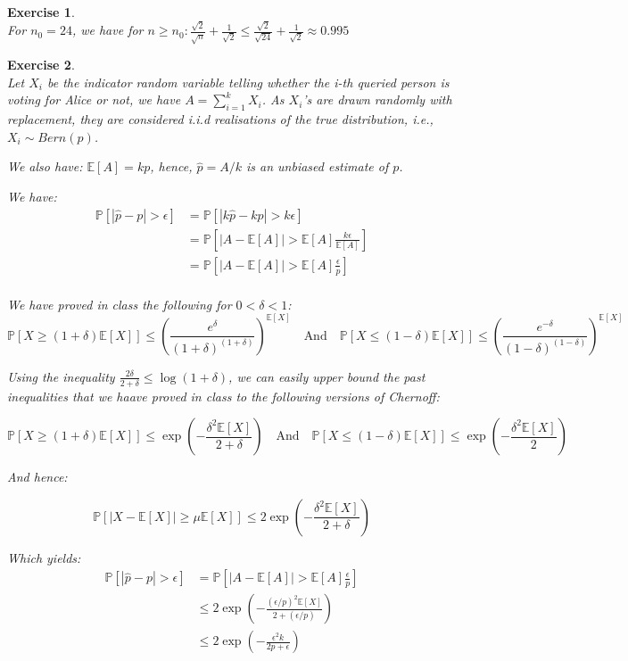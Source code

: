 \documentclass{article}
\newtheorem{exo}{Exercise}
\def\P{\mathbb{P}}
\def\E{\mathbb{E}}
\begin{document}
\begin{exo}{\ \\}
For $n_0  = 24$, we have for 
$n \geq n_0: 
\frac{\sqrt{2}}{\sqrt{n}} + \frac{1}{\sqrt{2}} 
\leq \frac{\sqrt{2}}{\sqrt{24}} + \frac{1}{\sqrt{2}} 
\approx 0.995 $

\end{exo}

\begin{exo}{\ \\}
    Let $X_i$ be the indicator random variable telling whether the i-th queried person is voting for Alice or not, we have $A = \sum^{k}_{i=1}  X_i$. As $X_i$'s are drawn randomly with replacement, 
    they are considered i.i.d realisations of the true distribution, i.e., $X_i \sim Bern(p) $.

We also have: $\E[A] = kp$, hence, $\hat{p} = A/k$ is an unbiased estimate of $p$.

We have:
\begin{align*}
    \P[|\hat{p}-p|>\epsilon]
    &= \P[|k\hat{p}-kp|>k\epsilon] \\
    &= \P\left[|A - \E[A]| > \E[A] \frac{k \epsilon}{\E[A]} \right] \\
    &= \P\left[|A - \E[A]| > \E[A] \frac{\epsilon}{p} \right] \\
\end{align*}

We have proved in class the following for $0< \delta<1$:
\[
\P[X \geq (1+\delta)\E[X]] \leq \left( \frac{e^\delta}{(1+\delta)^{(1+\delta)}}\right)
^{\E[X]}
\quad \text{And} \quad
\P[X \leq (1-\delta)\E[X]] \leq \left( \frac{e^{-\delta}}{(1-\delta)^{(1-\delta)}}\right)
^{\E[X]}
\]

Using the inequality $\frac{2\delta}{2+\delta} \leq \log{(1+\delta)}$, we can easily upper bound the past inequalities that we haave proved in class to the following versions of Chernoff:

\[
\P[X \geq (1+\delta)\E[X]] 
\leq 
\exp(-\frac{\delta^2 \E[X]}{2+\delta})
\quad \text{And} \quad
\P[X \leq (1-\delta)\E[X]] 
\leq 
\exp(-\frac{\delta^2 \E[X]}{2})
\]

And hence:

\[
\P\left[|X-\E[X]| \geq \mu \E[X]\right] 
\leq 2 \exp{(-\frac{\delta^2 \E[X]}{2+\delta})}
\]

Which yields:
\begin{align*}
    \P[|\hat{p}-p|>\epsilon]
    &= \P\left[|A - \E[A]| > \E[A] \frac{\epsilon}{p} \right] \\
    &\leq 2 \exp{\left(- \frac{(\epsilon/p)^2 \E[X]}{2 + (\epsilon/p)} \right)} \\
    &\leq 2 \exp{\left(- \frac{\epsilon^2 k}{2p + \epsilon} \right)}
\end{align*}


\end{exo}
\end{document}
